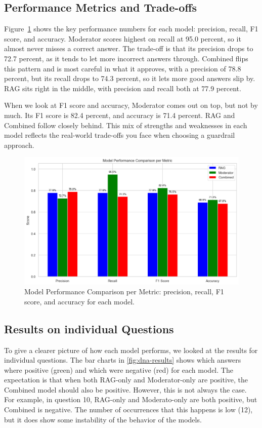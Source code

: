 \subsection{Performance Metrics and Trade-offs}

Figure~\ref{fig:model_performance_comparison_per_metric} shows the key performance numbers for each model: precision, recall, F1 score, and accuracy. Moderator scores highest on recall at 95.0 percent, so it almost never misses a correct answer. The trade-off is that its precision drops to 72.7 percent, as it tends to let more incorrect answers through. Combined flips this pattern and is most careful in what it approves, with a precision of 78.8 percent, but its recall drops to 74.3 percent, so it lets more good answers slip by. RAG sits right in the middle, with precision and recall both at 77.9 percent.

When we look at F1 score and accuracy, Moderator comes out on top, but not by much. Its F1 score is 82.4 percent, and accuracy is 71.4 percent. RAG and Combined follow closely behind. This mix of strengths and weaknesses in each model reflects the real-world trade-offs you face when choosing a guardrail approach.

\begin{figure}[ht]
  \centering
  \includegraphics[width=0.95\linewidth]{figures/model_performance comparison_per_metric.png}
  \caption{Model Performance Comparison per Metric: precision, recall, F1 score, and accuracy for each model.}
  \label{fig:model_performance_comparison_per_metric}
\end{figure}

\subsection{Results on individual Questions}
To give a clearer picture of how each model performs, we looked at the results for individual questions.
The bar charts in \autoref{fig:dna-results} shows which answers where positive (green) and which were negative (red) for each model.
The expectation is that when both RAG-only and Moderator-only are positive, the Combined model should also be positive.
However, this is not always the case. For example, in question 10, RAG-only and Moderato-only are both positive, but Combined is negative.
The number of occurrences that this happens is low (12), but it does show some instability of the behavior of the models.

